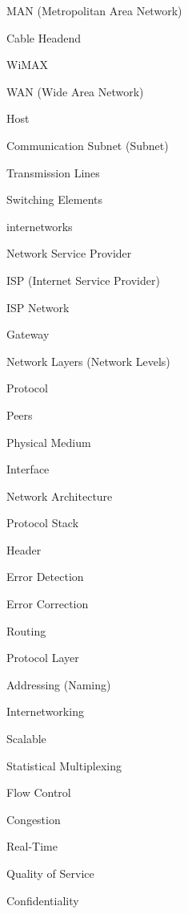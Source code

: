 \filbreak
\vskip 3mm
MAN (Metropolitan Area Network)

\filbreak
\vskip 3mm
Cable Headend

\filbreak
\vskip 3mm
WiMAX

\filbreak
\vskip 3mm
WAN (Wide Area Network)

\filbreak
\vskip 3mm
Host

\filbreak
\vskip 3mm
Communication Subnet (Subnet)

\filbreak
\vskip 3mm
Transmission Lines

\filbreak
\vskip 3mm
Switching Elements

\filbreak
\vskip 3mm
internetworks

\filbreak
\vskip 3mm
Network Service Provider

\filbreak
\vskip 3mm
ISP (Internet Service Provider)

\filbreak
\vskip 3mm
ISP Network

\filbreak
\vskip 3mm
Gateway

\filbreak
\vskip 3mm
Network Layers (Network Levels)

\filbreak
\vskip 3mm
Protocol

\filbreak
\vskip 3mm
Peers

\filbreak
\vskip 3mm
Physical Medium

\filbreak
\vskip 3mm
Interface

\filbreak
\vskip 3mm
Network Architecture

\filbreak
\vskip 3mm
Protocol Stack

\filbreak
\vskip 3mm
Header

\filbreak
\vskip 3mm
Error Detection

\filbreak
\vskip 3mm
Error Correction

\filbreak
\vskip 3mm
Routing

\filbreak
\vskip 3mm
Protocol Layer

\filbreak
\vskip 3mm
Addressing (Naming)

\filbreak
\vskip 3mm
Internetworking

\filbreak
\vskip 3mm
Scalable

\vskip 3mm
Statistical Multiplexing

\filbreak
\vskip 3mm
Flow Control

\filbreak
\vskip 3mm
Congestion

\filbreak
\vskip 3mm
Real-Time

\filbreak
\vskip 3mm
Quality of Service

\filbreak
\vskip 3mm
Confidentiality

